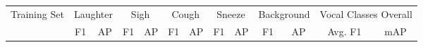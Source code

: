 \documentclass{article}
\begin{document}
\begin{table*}[t]
\centering
\small
\begin{tabular}{@{}ccccccccccccc@{}}
\toprule
                                            Training Set                  & \multicolumn{2}{c}{Laughter}                                                                                                         & \multicolumn{2}{c}{Sigh}                                                                                                             & \multicolumn{2}{c}{Cough}                                                                                                            & \multicolumn{2}{c}{Sneeze}                                                                                                           & \multicolumn{2}{c}{Background}                                                                                                       & \multicolumn{2}{c}{Vocal Classes Overall}                            \\ \cmidrule(l){2-13} 
                                                              & F1                                                     & \multicolumn{1}{c|}{AP}                                                     & F1                                                     & \multicolumn{1}{c|}{AP}                                                     & F1                                                     & \multicolumn{1}{c|}{AP}                                                     & F1                                                     & \multicolumn{1}{c|}{AP}                                                     & F1                                                     & \multicolumn{1}{c|}{AP}                                                     & Avg. F1                                                & mAP                                                    \\ \midrule

\end{tabular}
\end{table*}
\end{document}
